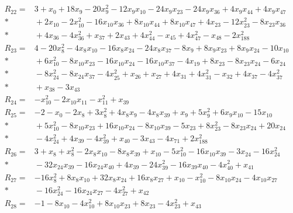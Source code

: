 \begin{align*}
R_{22} ={}& 3 + x_{0} + 18x_{9} - 20x_{9}^{2} - 12x_{9}x_{10} - 24x_{9}x_{23} - 24x_{9}x_{36} + 4x_{9}x_{44} + 4x_{9}x_{47} \\*
&{} + 2x_{10} - 2x_{10}^{2} - 16x_{10}x_{36} + 8x_{10}x_{44} + 8x_{10}x_{47} + 4x_{23} - 12x_{23}^{2} - 8x_{23}x_{36} \\*
&{} + 4x_{36} - 4x_{36}^{2} + x_{37} + 2x_{43} + 4x_{44}^{2} - x_{45} + 4x_{47}^{2} - x_{48} - 2x_{188}^{2} \\[4pt]
R_{23} ={}& 4 - 20x_{8}^{2} - 4x_{8}x_{10} - 16x_{8}x_{24} - 24x_{8}x_{37} - 8x_{9} + 8x_{9}x_{23} + 8x_{9}x_{24} - 10x_{10} \\*
&{} + 6x_{10}^{2} - 8x_{10}x_{23} - 16x_{10}x_{24} - 16x_{10}x_{37} - 4x_{19} + 8x_{23} - 8x_{23}x_{24} - 6x_{24} \\*
&{} - 8x_{24}^{2} - 8x_{24}x_{37} - 4x_{25}^{2} + x_{26} + x_{27} + 4x_{31} + 4x_{31}^{2} - x_{32} + 4x_{37} - 4x_{37}^{2} \\*
&{} + x_{38} - 3x_{43} \\[4pt]
R_{24} ={}& -x_{10}^{2} - 2x_{10}x_{11} - x_{11}^{2} + x_{39} \\[4pt]
R_{25} ={}& -2 - x_{0} - 2x_{8} + 3x_{8}^{2} + 4x_{8}x_{9} - 4x_{8}x_{39} + x_{9} + 5x_{9}^{2} + 6x_{9}x_{10} - 15x_{10} \\*
&{} + 5x_{10}^{2} - 8x_{10}x_{23} + 16x_{10}x_{24} - 8x_{10}x_{39} - 5x_{23} + 8x_{23}^{2} - 8x_{23}x_{24} + 20x_{24} \\*
&{} - 4x_{24}^{2} + 4x_{39} - 4x_{39}^{2} + x_{40} - 3x_{43} - 4x_{71} + 2x_{188}^{2} \\[4pt]
R_{26} ={}& 3 + x_{8} + x_{8}^{2} - 2x_{8}x_{10} - 8x_{8}x_{39} + x_{10} - 5x_{10}^{2} - 16x_{10}x_{39} - 3x_{24} - 16x_{24}^{2} \\*
&{} - 32x_{24}x_{39} - 16x_{24}x_{40} + 4x_{39} - 24x_{39}^{2} - 16x_{39}x_{40} - 4x_{40}^{2} + x_{41} \\[4pt]
R_{27} ={}& -16x_{8}^{2} + 8x_{8}x_{10} + 32x_{8}x_{24} + 16x_{8}x_{27} + x_{10} - x_{10}^{2} - 8x_{10}x_{24} - 4x_{10}x_{27} \\*
&{} - 16x_{24}^{2} - 16x_{24}x_{27} - 4x_{27}^{2} + x_{42} \\[4pt]
R_{28} ={}& -1 - 8x_{10} - 4x_{10}^{2} + 8x_{10}x_{23} + 8x_{23} - 4x_{23}^{2} + x_{43} \\[4pt]

\end{align*}
